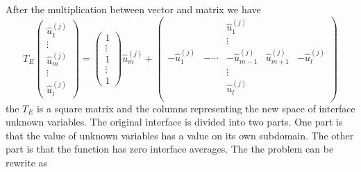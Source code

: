 After the multiplication between vector and matrix we have
\begin{equation}
T_{E} \begin{pmatrix}
\hat{u}_{1}^{(j)} \\ \vdots \\ \hat{u}_{m}^{(j)} \\ \vdots \\ \hat{u}_{l}^{(j)}
\end{pmatrix} = \begin{pmatrix}
1 \\ \vdots \\ 1 \\ \vdots \\ 1
\end{pmatrix} \hat{u}_{m}^{(j)} + \begin{pmatrix}
& & \hat{u}_{1}^{(j)} & & \\
& & \vdots & & \\
-\hat{u}_{1}^{(j)} & -\cdots & -\hat{u}_{m-1}^{(j)} & \hat{u}_{m+1}^{(j)} & -\hat{u}_{l}^{(j)}\\
& & \vdots & & \\
& & \hat{u}_{l}^{(j)} & & \\
\end{pmatrix}
\end{equation}
the $ T_{E} $ is a square matrix and the columns representing the new space of interface unknown variables. The original interface is divided into two parts. One part is that the value of unknown variables has a value on its own subdomain. The other part is that the function has zero interface averages. The the problem can be rewrite as

